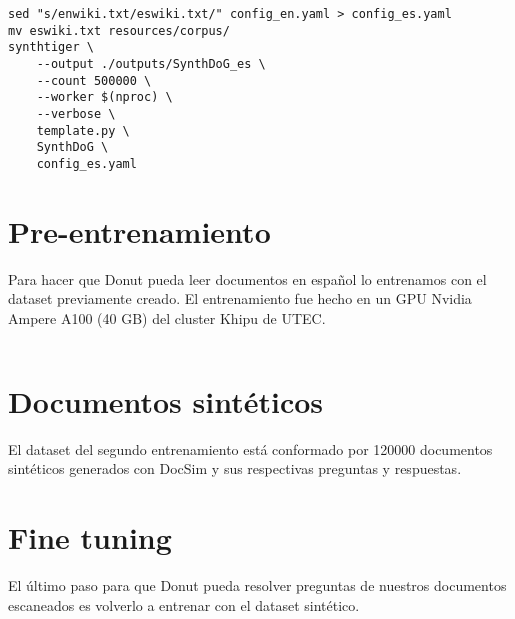\documentclass[../main.tex]{subfiles}
\begin{document}
\begin{verbatim}
sed "s/enwiki.txt/eswiki.txt/" config_en.yaml > config_es.yaml
mv eswiki.txt resources/corpus/
synthtiger \
	--output ./outputs/SynthDoG_es \
	--count 500000 \
	--worker $(nproc) \
	--verbose \
	template.py \
	SynthDoG \
	config_es.yaml
\end{verbatim}

\section{Pre-entrenamiento}

Para hacer que Donut pueda leer documentos en español
lo entrenamos con el dataset previamente creado.
El entrenamiento fue hecho en un GPU Nvidia Ampere A100 (40 GB) del cluster Khipu de UTEC.

\inputminted[bgcolor=codeBack, tabsize=2]{bash}{train-es.sh}

\section{Documentos sintéticos}
El dataset del segundo entrenamiento está conformado por 120000 documentos sintéticos generados con DocSim\cite{DocSim} y sus respectivas preguntas y respuestas.

\section{Fine tuning}

El último paso para que Donut pueda resolver preguntas de nuestros documentos escaneados es volverlo a entrenar con el dataset sintético.

\inputminted[bgcolor=codeBack, tabsize=2]{bash}{train-es-finetuned.sh}
\end{document}
